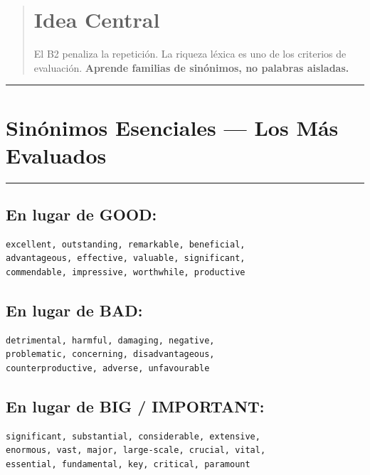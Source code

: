 \documentclass[
  spanish,
  letterpaper,
]{scrbook}
\begin{document}
\begin{quote}
\section{Idea Central}\label{idea-central-18}

El B2 penaliza la repetición. La riqueza léxica es uno de los criterios
de evaluación. \textbf{Aprende familias de sinónimos, no palabras
aisladas.}
\end{quote}

\begin{center}\rule{0.5\linewidth}{0.5pt}\end{center}

\section{Sinónimos Esenciales --- Los Más
Evaluados}\label{sinuxf3nimos-esenciales-los-muxe1s-evaluados}

\begin{center}\rule{0.5\linewidth}{0.5pt}\end{center}

\subsection{En lugar de GOOD:}\label{en-lugar-de-good}

\begin{verbatim}
excellent, outstanding, remarkable, beneficial,
advantageous, effective, valuable, significant,
commendable, impressive, worthwhile, productive
\end{verbatim}

\subsection{En lugar de BAD:}\label{en-lugar-de-bad}

\begin{verbatim}
detrimental, harmful, damaging, negative,
problematic, concerning, disadvantageous,
counterproductive, adverse, unfavourable
\end{verbatim}

\subsection{En lugar de BIG /
IMPORTANT:}\label{en-lugar-de-big-important}

\begin{verbatim}
significant, substantial, considerable, extensive,
enormous, vast, major, large-scale, crucial, vital,
essential, fundamental, key, critical, paramount
\end{verbatim}
\end{document}

